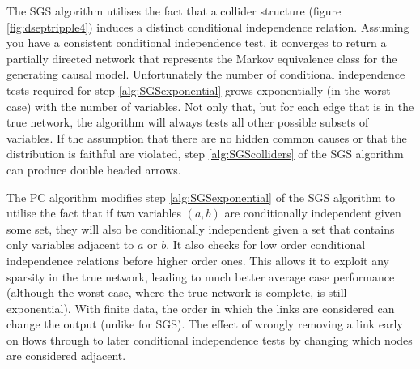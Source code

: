\documentclass[11pt,a4paper,oneside]{book}
\theoremstyle{plain}
\theoremstyle{definition}
\begin{document}
The SGS algorithm utilises the fact that a collider structure (figure \ref{fig:dseptripple4}) induces a distinct conditional independence relation. Assuming you have a consistent conditional independence test, it converges to return a partially directed network that represents the Markov equivalence class for the generating causal model. Unfortunately the number of conditional independence tests required for step \ref{alg:SGSexponential} grows exponentially (in the worst case) with the number of variables. Not only that, but for each edge that is in the true network, the algorithm will always tests all other possible subsets of variables. If the assumption that there are no hidden common causes or that the distribution is faithful are violated, step \ref{alg:SGScolliders} of the SGS algorithm can produce double headed arrows.

The PC algorithm \cite{Sprites} modifies step \ref{alg:SGSexponential} of the SGS algorithm to utilise the fact that if two variables $(a,b)$ are conditionally independent given some set, they will also be conditionally independent given a set that contains only variables adjacent to $a$ or $b$. It also checks for low order conditional independence relations before higher order ones. This allows it to exploit any sparsity in the true network, leading to much better average case performance  \cite{Sprites} (although the worst case, where the true network is complete, is still exponential). With finite data, the order in which the links are considered can change the output (unlike for SGS). The effect of wrongly removing a link early on flows through to later conditional independence tests by changing which nodes are considered adjacent.
\end{document}
